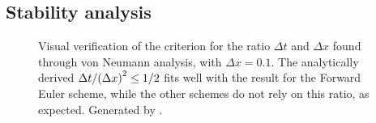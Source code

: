 \subsection{Stability analysis}
\begin{figure}[H]
\centering

\caption{Visual verification of the criterion for the ratio \(\Delta t\) and \(\Delta x\) found through von Neumann analysis, with \(\Delta x = \num{0.1}\). The analytically derived \(\Delta t/\qty(\Delta x)^2\leq1/2\) fits well with the result for the Forward Euler scheme, while the other schemes do not rely on this ratio, as expected. Generated by .}
\end{figure}
